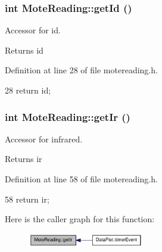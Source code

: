 \hypertarget{classMoteReading_a123a08348d6a1ba80a4055cb5f5afaa6}{
\subsubsection[{getId}]{\setlength{\rightskip}{0pt plus 5cm}int MoteReading::getId ()}}
\label{classMoteReading_a123a08348d6a1ba80a4055cb5f5afaa6}


Accessor for id. 

\begin{DoxyReturn}{Returns}
id 
\end{DoxyReturn}


Definition at line 28 of file motereading.h.




\begin{DoxyCode}
28 { return id; }
\end{DoxyCode}


\hypertarget{classMoteReading_aff0d87f9c667d01f7e37a114afa321fa}{
\subsubsection[{getIr}]{\setlength{\rightskip}{0pt plus 5cm}int MoteReading::getIr ()}}
\label{classMoteReading_aff0d87f9c667d01f7e37a114afa321fa}


Accessor for infrared. 

\begin{DoxyReturn}{Returns}
ir 
\end{DoxyReturn}


Definition at line 58 of file motereading.h.




\begin{DoxyCode}
58 { return ir; }
\end{DoxyCode}




Here is the caller graph for this function:\nopagebreak
\begin{figure}[H]
\begin{center}
\leavevmode
\includegraphics[width=143pt]{classMoteReading_aff0d87f9c667d01f7e37a114afa321fa_icgraph}
\end{center}
\end{figure}


